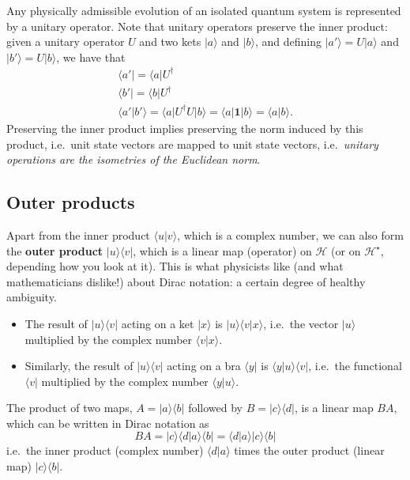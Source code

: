 \documentclass[fleqn]{article}
\providecommand{\tightlist}{%
  \setlength{\itemsep}{0pt}\setlength{\parskip}{0pt}}
\begin{document}
Any physically admissible evolution of an isolated quantum system is represented by a unitary operator.
Note that unitary operators preserve the inner product: given a unitary operator \(U\) and two kets \(|a\rangle\) and \(|b\rangle\), and defining \(|a'\rangle=U|a\rangle\) and \(|b'\rangle=U|b\rangle\), we have that
\[
  \begin{gathered}
    \langle a'|=\langle a|U^\dagger
  \\\langle b'|=\langle b|U^\dagger
  \\\langle a'|b'\rangle=\langle a|U^\dagger U|b\rangle=\langle a|\mathbf{1}|b\rangle=\langle a|b\rangle.
  \end{gathered}
\]
Preserving the inner product implies preserving the norm induced by this product, i.e.~unit state vectors are mapped to unit state vectors, i.e.~\emph{unitary operations are the isometries of the Euclidean norm}.

\hypertarget{outer-products}{%
\subsection{Outer products}\label{outer-products}}

Apart from the inner product \(\langle u|v\rangle\), which is a complex number, we can also form the \textbf{outer product} \(|u\rangle\langle v|\), which is a linear map (operator) on \(\mathcal{H}\) (or on \(\mathcal{H}^\star\), depending how you look at it).
This is what physicists like (and what mathematicians dislike!) about Dirac notation: a certain degree of healthy ambiguity.

\begin{itemize}
\tightlist
\item
  The result of \(|u\rangle\langle v|\) acting on a ket \(|x\rangle\) is \(|u\rangle\langle v|x\rangle\), i.e.~the vector \(|u\rangle\) multiplied by the complex number \(\langle v|x\rangle\).
\item
  Similarly, the result of \(|u\rangle\langle v|\) acting on a bra \(\langle y|\) is \(\langle y|u\rangle\langle v|\), i.e.~the functional \(\langle v|\) multiplied by the complex number \(\langle y|u\rangle\).
\end{itemize}

The product of two maps, \(A=|a\rangle\langle b|\) followed by \(B=|c\rangle\langle d|\), is a linear map \(BA\), which can be written in Dirac notation as
\[
  BA = |c\rangle\langle d|a\rangle\langle b| = \langle d|a\rangle|c\rangle\langle b|
\]
i.e.~the inner product (complex number) \(\langle d|a\rangle\) times the outer product (linear map) \(|c\rangle\langle b|\).
\end{document}
